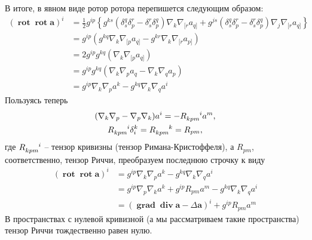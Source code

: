 \documentclass[12pt,a4paper]{article}
\DeclareMathOperator{\Rot}{\mathbf{rot}}
\DeclareMathOperator{\Grad}{\mathbf{grad}}
\DeclareMathOperator{\Div}{\mathbf{div}}
\newcommand{\V}[1]{\mathbf{#1}}
\begin{document}
        В итоге, в явном виде ротор ротора перепишется следующим образом:
        \begin{equation}\begin{aligned}
            \left( \Rot\Rot\V{a} \right)^i
                &= \frac{1}{2} g^{ip} \left\{
                       g^{ks} \left(
                           \delta_s^q \delta_p^r - \delta_s^r \delta_p^q
                       \right) \nabla_k \nabla_{[r} a_{q]} +
                       g^{js} \left(
                           \delta_s^q \delta_p^r - \delta_s^r \delta_p^q
                       \right) \nabla_j \nabla_{[r} a_{q]}
                   \right\} \\
                &= g^{ip} \left(
                       g^{kq} \nabla_k \nabla_{[p} a_{q]} - g^{kr} \nabla_k \nabla_{[r} a_{p]}
                   \right) \\
                &= 2 g^{ip} g^{kq} \left(
                       \nabla_k \nabla_{[p} a_{q]}
                   \right) \\
                &= g^{ip} g^{kq} \left(
                       \nabla_k \nabla_{p} a_{q} - \nabla_k \nabla_{q} a_{p}
                   \right) \\
                &= g^{ip} \nabla_k \nabla_{p} a^k - g^{kq} \nabla_k \nabla_{q} a^i
        \end{aligned}\end{equation}
        Пользуясь теперь
        \begin{equation}\begin{gathered}
            (\nabla_k \nabla_p - \nabla_p \nabla_k) a^i = - R_{kpm}^{\hphantom{kpm}i} a^m , \\
            R_{kpm}^{\hphantom{kpm}i} \delta_i^k = R_{kpm}^{\hphantom{kpm}k} = R_{pm} ,
        \end{gathered}\end{equation}
        где $R_{kpm}^{\hphantom{kpm}i}$ -- тензор кривизны (тензор Римана-Кристоффеля), а $R_{pm}$, соответственно, тензор Риччи, преобразуем последнюю строчку к виду
        \begin{equation}\begin{aligned}
            \left( \Rot\Rot\V{a} \right)^i
                &= g^{ip} \nabla_k \nabla_p a^k - g^{kq} \nabla_k \nabla_q a^i \\
                &= g^{ip} \nabla_p \nabla_k a^k
                    + g^{ip} R_{pm} a^m
                    - g^{kq} \nabla_k \nabla_q a^i \\
                &= \left( \Grad\Div{\V{a}} - \Delta{\V{a}} \right)^i + g^{ip} R_{pm} a^m
        \end{aligned}\end{equation}
        В пространствах с нулевой кривизной (а мы рассматриваем такие пространства) тензор Риччи тождественно равен нулю.
\end{document}

